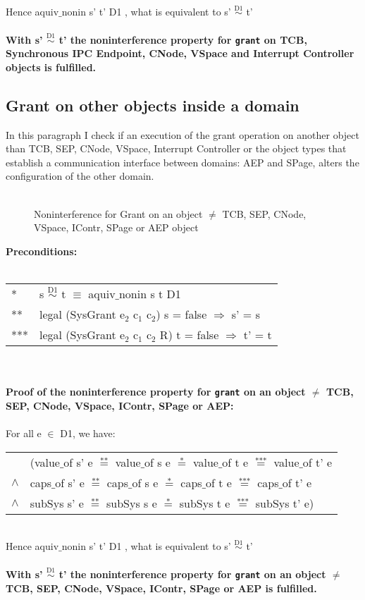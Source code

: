 Hence aquiv$\_$nonin s' t' D1 , what is equivalent to s' $\overset{\text{D1}}{\sim}$ t' \\ \\ 
\textbf{With s' $\overset{\text{D1}}{\sim}$ t' the noninterference property for \texttt{grant} on TCB, Synchronous IPC Endpoint, CNode, VSpace and Interrupt Controller objects is fulfilled.} 
\subsection{Grant on other objects inside a domain} 
In this paragraph I check if an execution of the grant operation on another object than TCB, SEP, CNode, VSpace, Interrupt Controller or the object types that establish a communication interface between domains: AEP and SPage, alters the configuration of the other domain. \\ \\
\begin{figure}[H]
\caption{Noninterference for Grant on an object $\neq$ TCB, SEP, CNode, VSpace, IContr, SPage or AEP object}
\end{figure}
\textbf{Preconditions:} \\ \\
\begin{tabular}{ll}
* & s $\overset{\text{D1}}{\sim}$ t $\equiv$ aquiv$\_$nonin s t D1	\\ 
** & legal (SysGrant e$_2$ c$_1$ c$_2$) s = false $\Rightarrow$ s' = s \\ 
*** & legal (SysGrant e$_2$ c$_1$ c$_2$ R) t = false $\Rightarrow$ t' = t
\end{tabular}\\ \\ 
\textbf{Proof of the noninterference property for \texttt{grant} on an object $\neq$ TCB, SEP, CNode, VSpace, IContr, SPage or AEP:}\\ \\
For all e $\in$ D1, we have: \\ 
\begin{tabular}{ll}
& (value$\_$of s' e $\overset{\text{**}}{=}$ value$\_$of s e $\overset{\text{*}}{=}$ value$\_$of t e $\overset{\text{***}}{=}$ value$\_$of t' e \\
$\wedge$ & caps$\_$of s' e $\overset{\text{**}}{=}$ caps$\_$of s e $\overset{\text{*}}{=}$ caps$\_$of t e $\overset{\text{***}}{=}$ caps$\_$of t' e \\
$\wedge$ & subSys s' e $\overset{\text{**}}{=}$ subSys s e $\overset{\text{*}}{=}$ subSys t e $\overset{\text{***}}{=}$ subSys t' e)
\end{tabular} \\
Hence aquiv$\_$nonin s' t' D1 , what is equivalent to s' $\overset{\text{D1}}{\sim}$ t' \\ \\ 
\textbf{With s' $\overset{\text{D1}}{\sim}$ t' the noninterference property for \texttt{grant} on an object $\neq$ TCB, SEP, CNode, VSpace, IContr, SPage or AEP is fulfilled.} 
